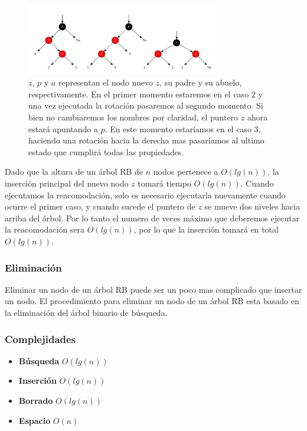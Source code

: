 \documentclass[10pt, a4paper]{report}
\begin{document}
\begin{figure}
 \centering
 \includegraphics[width=0.75\textwidth]{RBCaso3.pdf}
 \caption*{\newline \footnotesize $z$, $p$ y $a$ representan el nodo nuevo $z$, su padre y su abuelo, respectivamente. En el primer momento estaremos en el caso $2$ y una vez ejecutada la rotaci\'on pasaremos al segundo momento. Si bien no cambiaremos los nombres por claridad, el puntero $z$ ahora estar\'a apuntando a $p$. En este momento estar\'iamos en el caso $3$, haciendo una rotaci\'on hacia la derecha mas pasar\'iamos al ultimo estado que cumplir\'a todas las propiedades.}
\end{figure}
 
Dado que la altura de un \'arbol RB de $n$ nodos pertenece a $O(lg(n))$, la inserci\'on principal del nuevo nodo $z$ tomar\'a tiempo $O(lg(n))$. Cuando ejecutamos la reacomodaci\'on, solo es necesario ejecutarla nuevamente cuando ocurre el primer caso, y cuando sucede el puntero de $z$ se mueve dos niveles hacia arriba del \'arbol. Por lo tanto el numero de veces m\'aximo que deberemos ejecutar la reacomodaci\'on sera $O(lg(n))$, por lo que la inserci\'on tomar\'a en total $O(lg(n))$.

\subsubsection{Eliminaci\'on}

Eliminar un nodo de un \'arbol RB puede ser un poco mas complicado que insertar un nodo. El procedimiento para eliminar un nodo de un \'arbol RB esta basado en la eliminaci\'on del \'arbol binario de b\'usqueda.


\subsubsection{Complejidades}

\begin{itemize}
 \item \textbf{B\'usqueda} $O(lg(n))$
 \item \textbf{Inserci\'on} $O(lg(n))$
 \item \textbf{Borrado} $O(lg(n))$
 \item \textbf{Espacio} $O(n)$
\end{itemize}
\end{document}
